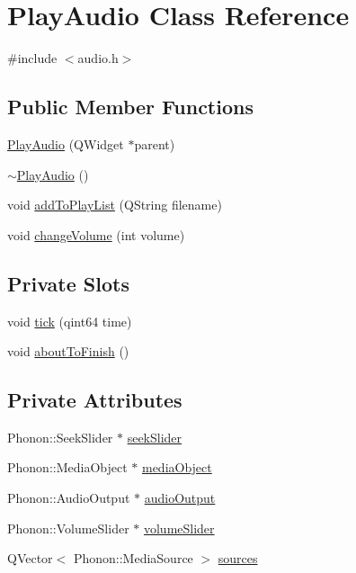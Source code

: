 \hypertarget{classPlayAudio}{
\section{PlayAudio Class Reference}
\label{classPlayAudio}
}


{\ttfamily \#include $<$audio.h$>$}

\subsection*{Public Member Functions}
\begin{DoxyCompactItemize}
\item 
\hyperlink{classPlayAudio_a24ee7646e4daf07c48f6ae0a6c614d99}{PlayAudio} (QWidget $\ast$parent)
\item 
\hyperlink{classPlayAudio_a6579ebf541610694149cb1bfa5b49fba}{$\sim$PlayAudio} ()
\item 
void \hyperlink{classPlayAudio_a7fe323da18d53e4f7a7999b59714e278}{addToPlayList} (QString filename)
\item 
void \hyperlink{classPlayAudio_a223c9b8cc910ee1fd96e73936f82e2b2}{changeVolume} (int volume)
\end{DoxyCompactItemize}
\subsection*{Private Slots}
\begin{DoxyCompactItemize}
\item 
void \hyperlink{classPlayAudio_ab4b1de1ed5ae1f78771b32348a0b2286}{tick} (qint64 time)
\item 
void \hyperlink{classPlayAudio_a01311f0e2678f67b2b192e9f9c0fa477}{aboutToFinish} ()
\end{DoxyCompactItemize}
\subsection*{Private Attributes}
\begin{DoxyCompactItemize}
\item 
Phonon::SeekSlider $\ast$ \hyperlink{classPlayAudio_ae1feb0a9b9fcf14d2aedf599dbbe9335}{seekSlider}
\item 
Phonon::MediaObject $\ast$ \hyperlink{classPlayAudio_a58c02857fd039d8015c0fae749682e91}{mediaObject}
\item 
Phonon::AudioOutput $\ast$ \hyperlink{classPlayAudio_a91e318098e325117af6e94c9aaf826ef}{audioOutput}
\item 
Phonon::VolumeSlider $\ast$ \hyperlink{classPlayAudio_a27e1f47c759326c30eca15178a3392e7}{volumeSlider}
\item 
QVector$<$ Phonon::MediaSource $>$ \hyperlink{classPlayAudio_aa80d497cf68f1acd768f5abdb564a60a}{sources}
\end{DoxyCompactItemize}


